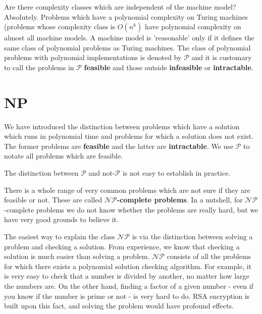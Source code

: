 \documentclass[11pt]{article}
\begin{document}
	\par Are there complexity classes which are independent of the machine model? Absolutely. Problems which have a polynomial complexity on Turing machines (problems whose complexity class is $O(n^{k})$ have polynomial complexity on almost all machine models. A machine model is 'reasonable' only if it defines the same class of polynomial problems as Turing machines. The class of polynomial problems with polynomial implementations is denoted by $\mathcal{P}$ and it is customary to call the problems in $\mathcal{P}$ \textbf{feasible} and those outside \textbf{infeasible} or \textbf{intractable}.
	
	\section{NP}
	We have introduced the distinction between problems which have a solution which runs in polynomial time and problems for which a solution does not exist. The former problems are \textbf{feasible} and the latter are \textbf{intractable}. We use $\mathcal{P}$ to notate all problems which are feasible.
	
	\par 
	The distinction between $\mathcal{P}$ and not-$\mathcal{P}$ is not easy to establish in practice.
	
	\par 
	There is a whole range of very common problems which are not sure if they are feasible or not. These are called \textbf{$\mathcal{NP}$-complete problems}. In a nutshell, for $\mathcal{NP}$-complete problems we do not know whether the problems are really hard, but we have very good grounds to believe it.
	
	\par 
	The easiest way to explain the class $\mathcal{NP}$ is via the distinction between solving a problem and checking a solution. From experience, we know that checking a solution is much easier than solving a problem. $\mathcal{NP}$ consists of all the problems for which there exists a polynomial solution checking algorithm. For example, it is very easy to check that a number is divided by another, no matter how large the numbers are. On the other hand, finding a factor of a given number - even if you know if the number is prime or not - is very hard to do. RSA encryption is built upon this fact, and solving the problem would have profound effects. 
	
\end{document}
